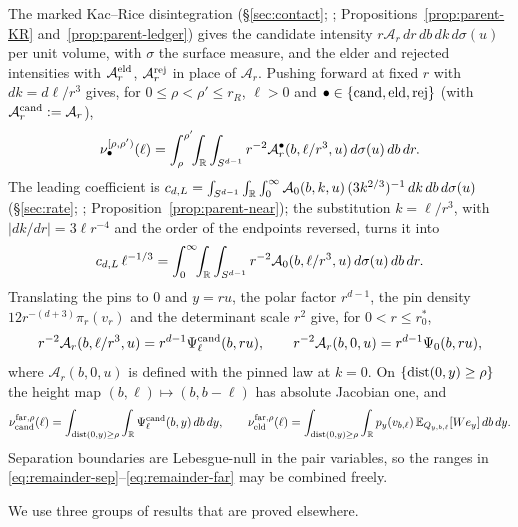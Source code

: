 The marked Kac--Rice disintegration (\S\ref{sec:contact}; \cite[\S\S9--10, (10.2)]{parentP}; Propositions~\ref{prop:parent-KR} and~\ref{prop:parent-ledger}) gives the candidate intensity $r\mathcal A_r\,dr\,db\,dk\,d\sigma(u)$ per unit volume, with $\sigma$ the surface measure, and the elder and rejected intensities with $\mathcal A^{\mathrm{eld}}_r$, $\mathcal A^{\mathrm{rej}}_r$ in place of $\mathcal A_r$. Pushing forward at fixed $r$ with $dk=d\ell/r^3$ gives, for $0\le\rho<\rho'\le r_R$, $\ell>0$ and $\bullet\in\{\mathrm{cand},\mathrm{eld},\mathrm{rej}\}$ (with $\mathcal A^{\mathrm{cand}}_r:=\mathcal A_r$),
\begin{equation}\label{eq:remainder-sep}
\nu_\bullet^{[\rho,\rho')}(\ell)=\int_\rho^{\rho'}\!\!\int_\mathbb R\int_{S^{d-1}}r^{-2}\mathcal A^\bullet_r(b,\ell/r^3,u)\,d\sigma(u)\,db\,dr .
\end{equation}
The leading coefficient is $c_{d,L}=\int_{S^{d-1}}\int_\mathbb R\int_0^\infty\mathcal A_0(b,k,u)\,(3k^{2/3})^{-1}\,dk\,db\,d\sigma(u)$ (\S\ref{sec:rate}; \cite[(13.6)]{parentP}; Proposition~\ref{prop:parent-near}); the substitution $k=\ell/r^3$, with $|dk/dr|=3\ell r^{-4}$ and the order of the endpoints reversed, turns it into
\begin{equation}\label{eq:remainder-lead}
c_{d,L}\,\ell^{-1/3}=\int_0^\infty\!\!\int_\mathbb R\int_{S^{d-1}}r^{-2}\mathcal A_0(b,\ell/r^3,u)\,d\sigma(u)\,db\,dr .
\end{equation}
Translating the pins to $0$ and $y=ru$, the polar factor $r^{d-1}$, the pin density $12r^{-(d+3)}\pi_r(v_r)$ and the determinant scale $r^2$ give, for $0<r\le r_0^*$,
\begin{equation}\label{eq:remainder-polar}
r^{-2}\mathcal A_r(b,\ell/r^3,u)=r^{d-1}\Psi^{\mathrm{cand}}_\ell(b,ru),\qquad r^{-2}\mathcal A_r(b,0,u)=r^{d-1}\Psi_0(b,ru),
\end{equation}
where $\mathcal A_r(b,0,u)$ is defined with the pinned law at $k=0$. On $\{\operatorname{dist}(0,y)\ge\rho\}$ the height map $(b,\ell)\mapsto(b,b-\ell)$ has absolute Jacobian one, and
\begin{equation}\label{eq:remainder-far}
\nu_{\mathrm{cand}}^{\mathrm{far},\rho}(\ell)=\int_{\operatorname{dist}(0,y)\ge\rho}\int_\mathbb R\Psi^{\mathrm{cand}}_\ell(b,y)\,db\,dy,\qquad
\nu_{\mathrm{eld}}^{\mathrm{far},\rho}(\ell)=\int_{\operatorname{dist}(0,y)\ge\rho}\int_\mathbb R p_y(v_{b,\ell})\,\mathbb E_{Q_{y,b,\ell}}[We_y]\,db\,dy .
\end{equation}
Separation boundaries are Lebesgue-null in the pair variables, so the ranges in \eqref{eq:remainder-sep}--\eqref{eq:remainder-far} may be combined freely.

We use three groups of results that are proved elsewhere.

